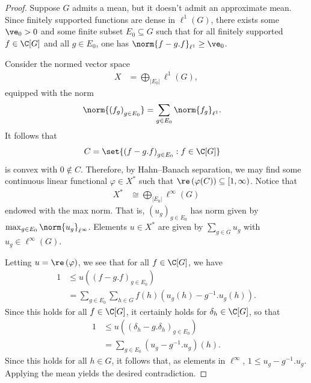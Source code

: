 \documentclass[10pt]{mypackage}
\begin{document}
\begin{proof}
  Suppose $G$ admits a mean, but it doesn't admit an approximate mean. Since finitely supported functions are dense in $\ell^1\left( G \right)$, there exists some $\ve_0 > 0$ and some finite subset $E_0\subseteq G$ such that for all finitely supported $f\in \C[G]$ and all $g\in E_0$, one has $\norm{f-g.f}_{\ell^1}\geq \ve_0$.

  Consider the normed vector space
  \begin{align*}
    X &= \bigoplus_{\left\vert E_0 \right\vert} \ell^1\left( G \right),
  \end{align*}
  equipped with the norm
  \begin{align*}
    \norm{\left( f_g \right)_{g\in E_0}} &= \sum_{g\in E_0} \norm{f_g}_{\ell^1}.
  \end{align*}
  It follows that
  \begin{align*}
    C &= \set{ \left( f - g.f \right)_{g\in E_0} : f\in \C[G] }
  \end{align*}
  is convex with $0\notin C$. Therefore, by Hahn--Banach separation, we may find some continuous linear functional $\varphi\in X^{\ast}$ such that $\re\left( \varphi(C) \right)\subseteq [1,\infty)$. Notice that
  \begin{align*}
    X^{\ast} &\cong \bigoplus_{\left\vert E_0 \right\vert} \ell^{\infty}\left( G \right)
  \end{align*}
  endowed with the max norm. That is, $\left( u_g \right)_{g\in E_0}$ has norm given by $\max_{g\in E_0}\norm{u_g}_{\ell^{\infty}}$. Elements $u\in X^{\ast}$ are given by $\sum_{g\in G}u_g$ with $u_g\in \ell^{\infty}\left( G \right)$.

  Letting $u = \re\left( \varphi \right)$, we see that for all $f\in \C[G]$, we have
  \begin{align*}
    1 &\leq u\left( \left( f-g.f \right)_{g\in E_0} \right)\\
      &= \sum_{g\in E_0} \sum_{h\in G} f\left( h \right)\left( u_g\left( h \right) - g^{-1}.u_g(h) \right).
  \end{align*}
  Since this holds for all $f\in \C[G]$, it certainly holds for $\delta_h\in \C[G]$, so that 
  \begin{align*}
    1&\leq u\left( \left( \delta_h - g.\delta_h \right)_{g\in E_0} \right)\\
     &= \sum_{g\in E_0} \left( u_g - g^{-1}.u_g \right)(h).
  \end{align*}
  Since this holds for all $h\in G$, it follows that, as elements in $\ell^{\infty}$, $1\leq u_g - g^{-1}.u_g$. Applying the mean yields the desired contradiction.
\end{proof}
\end{document}
